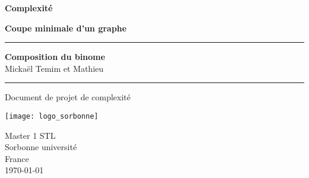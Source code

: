 \begin{titlepage}
\begin{center}

\vspace*{1cm}

\Large
\textbf{Complexité}

\vspace*{0.5cm}

\Huge
\textbf{Coupe minimale d'un graphe}

\normalsize

\vspace{3cm}

\rule{5cm}{0.4pt}

\textbf{Composition du binome} \\ 
Mickaël Temim et Mathieu \\

\vspace{0.5cm}

\rule{5cm}{0.4pt}



\vfill

Document de projet de complexité

\vspace{0.8cm}

\texttt{[image: logo\_sorbonne]}

Master 1 STL \\
Sorbonne université \\
France \\
\today

\end{center}
\end{titlepage}
